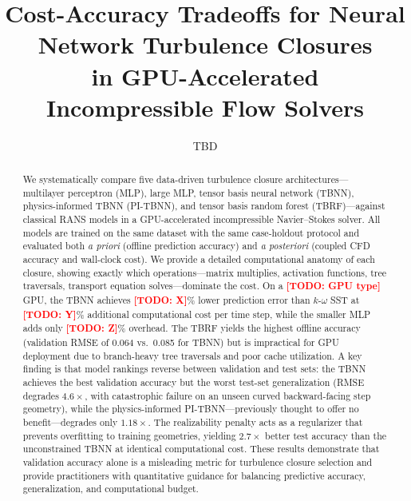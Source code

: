 \documentclass[11pt]{article}
\title{Cost-Accuracy Tradeoffs for Neural Network Turbulence Closures\\in GPU-Accelerated Incompressible Flow Solvers}
\author{TBD}
\date{}
\newcommand{\todo}[1]{\textcolor{red}{\textbf{[TODO: #1]}}}
\begin{document}
\maketitle

\begin{abstract}
We systematically compare five data-driven turbulence closure architectures---multilayer perceptron (MLP), large MLP, tensor basis neural network (TBNN), physics-informed TBNN (PI-TBNN), and tensor basis random forest (TBRF)---against classical RANS models in a GPU-accelerated incompressible Navier--Stokes solver.
All models are trained on the same dataset \citep{McConkey2021} with the same case-holdout protocol and evaluated both \emph{a priori} (offline prediction accuracy) and \emph{a posteriori} (coupled CFD accuracy and wall-clock cost).
We provide a detailed computational anatomy of each closure, showing exactly which operations---matrix multiplies, activation functions, tree traversals, transport equation solves---dominate the cost.
On a \todo{GPU type} GPU, the TBNN achieves \todo{X}\% lower prediction error than $k$-$\omega$ SST at \todo{Y}\% additional computational cost per time step, while the smaller MLP adds only \todo{Z}\% overhead.
The TBRF yields the highest offline accuracy (validation RMSE of 0.064 vs.\ 0.085 for TBNN) but is impractical for GPU deployment due to branch-heavy tree traversals and poor cache utilization.
A key finding is that model rankings reverse between validation and test sets: the TBNN achieves the best validation accuracy but the worst test-set generalization (RMSE degrades $4.6\times$, with catastrophic failure on an unseen curved backward-facing step geometry), while the physics-informed PI-TBNN---previously thought to offer no benefit---degrades only $1.18\times$.
The realizability penalty acts as a regularizer that prevents overfitting to training geometries, yielding $2.7\times$ better test accuracy than the unconstrained TBNN at identical computational cost.
These results demonstrate that validation accuracy alone is a misleading metric for turbulence closure selection and provide practitioners with quantitative guidance for balancing predictive accuracy, generalization, and computational budget.
\end{abstract}











\appendix




\end{document}
